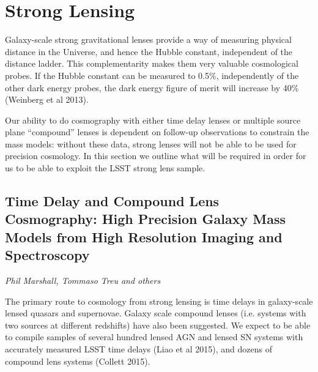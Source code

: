
\section{Strong Lensing}
\label{sec:sl}

Galaxy-scale strong gravitational lenses provide a way of measuring
physical distance in the Universe, and hence the Hubble constant,
independent of the distance ladder.  This complementarity makes them
very valuable cosmological probes. If the Hubble constant can be
measured to 0.5\%, independently of  the other dark energy probes, the
dark energy figure of merit will increase by 40\% (Weinberg et al 2013).

Our ability to do cosmography with either time delay lenses or multiple
source plane ``compound'' lenses is dependent on follow-up observations
to constrain the mass models: without these data, strong lenses will not
be able to be used for precision cosmology. In this section we outline what will be
required in order for us to be able to exploit the LSST strong lens sample.


\subsection{Time Delay and Compound Lens Cosmography: High Precision Galaxy Mass Models from High Resolution Imaging and Spectroscopy}
{\it Phil Marshall, Tommaso Treu and others}

The primary route to cosmology from strong lensing is time delays in
galaxy-scale lensed quasars and supernovae. Galaxy scale compound lenses
(i.e. systems with two sources at different redshifts) have also been
suggested. We expect to be able to compile samples of several hundred lensed AGN
and lensed SN systems with accurately measured LSST time delays (Liao et al 2015),
and dozens of compound lens systems (Collett 2015).

